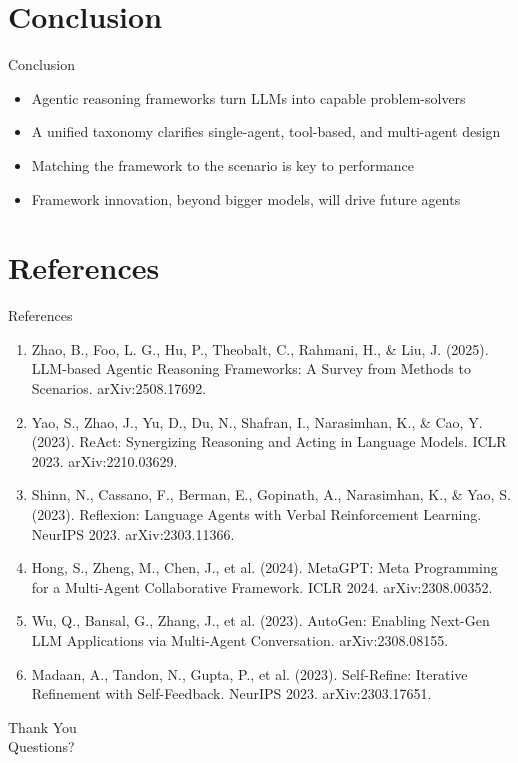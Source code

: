 \documentclass[10pt]{beamer}
\begin{document}
\section{Conclusion}
\begin{frame}{Conclusion}
\begin{itemize}
  \item Agentic reasoning frameworks turn LLMs into capable problem-solvers
  \item A unified taxonomy clarifies single-agent, tool-based, and multi-agent design
  \item Matching the framework to the scenario is key to performance
  \item Framework innovation, beyond bigger models, will drive future agents
\end{itemize}
\end{frame}
\section{References}
\begin{frame}[allowframebreaks]{References}
  \footnotesize
  \begin{enumerate}
    \item Zhao, B., Foo, L. G., Hu, P., Theobalt, C., Rahmani, H., \& Liu, J. (2025). LLM-based Agentic Reasoning Frameworks: A Survey from Methods to Scenarios. arXiv:2508.17692.
    \item Yao, S., Zhao, J., Yu, D., Du, N., Shafran, I., Narasimhan, K., \& Cao, Y. (2023). ReAct: Synergizing Reasoning and Acting in Language Models. ICLR 2023. arXiv:2210.03629.
    \item Shinn, N., Cassano, F., Berman, E., Gopinath, A., Narasimhan, K., \& Yao, S. (2023). Reflexion: Language Agents with Verbal Reinforcement Learning. NeurIPS 2023. arXiv:2303.11366.
    \item Hong, S., Zheng, M., Chen, J., et al. (2024). MetaGPT: Meta Programming for a Multi-Agent Collaborative Framework. ICLR 2024. arXiv:2308.00352.
    \item Wu, Q., Bansal, G., Zhang, J., et al. (2023). AutoGen: Enabling Next-Gen LLM Applications via Multi-Agent Conversation. arXiv:2308.08155.
    \item Madaan, A., Tandon, N., Gupta, P., et al. (2023). Self-Refine: Iterative Refinement with Self-Feedback. NeurIPS 2023. arXiv:2303.17651.
  \end{enumerate}
\end{frame}
\begin{frame}[plain]
  \begin{center}
    {\Huge Thank You}\\[1em]
    {\large Questions?}
  \end{center}
\end{frame}
\end{document}
